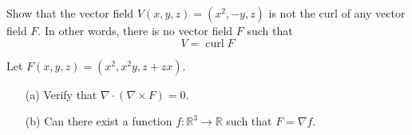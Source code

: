 \documentclass[openany]{book}
\newcommand{\R}{\mathbb{R}}
\newcommand{\curl}{\operatorname{curl}}
\begin{document}

\begin{prob}
    Show that the vector field $V(x,y,z)=(x^2, -y, z)$ is not the curl of any vector field $F$. In other words, there is no vector field $F$ such that 
    \begin{equation*}
        V=\curl F
    \end{equation*}
\end{prob}




\begin{prob}
    Let $F(x,y,z)=(x^2, x^2y, z+zx)$.
    \begin{enumerate}
        \item[(a)] Verify that $\nabla\cdot(\nabla\times F)=0$.
        \item[(b)] Can there exist a function $f:\R^3\to\R$ such that $F=\nabla f$.  
    \end{enumerate}
\end{prob}
\end{document}
